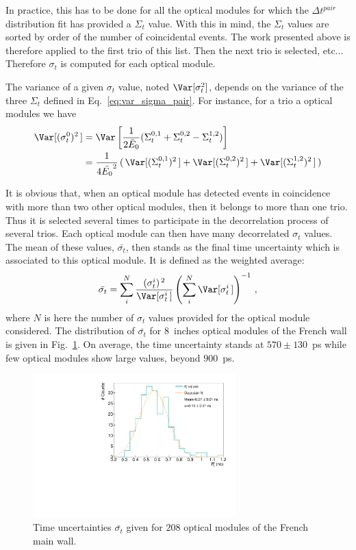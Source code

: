 In practice, this has to be done for all the optical modules for which the $\Delta {t}^{pair}$ distribution fit has provided a $\Sigma_{t}$ value.
With this in mind, the $\Sigma_{t}$ values are sorted by order of the number of coincidental events.
The work presented above is therefore applied to the first trio of this list.
Then the next trio is selected, etc...
Therefore $\sigma_{t}$ is computed for each optical module.

The variance of a given $\sigma_{t}$ value, noted $\Var[\sigma_{t}^{2}]$, depends on the variance of the three $\Sigma_{t}$ defined in Eq.~\eqref{eq:var_sigma_pair}.
For instance, for a trio a optical modules we have
\begin{align}
  \Var[(\sigma_{t}^{0})^{2}\,] &= \Var \left[ \frac{1}{2\bar{E}_{0}} (\Sigma_{t}^{0,1}+\Sigma_{t}^{0,2}-\Sigma_{t}^{1,2}) \right] \\
  &= \frac{1}{4\bar{E_{0}}^{2}}\, (\,\Var[(\Sigma_{t}^{0,1})^{2}\,]+\Var[(\Sigma_{t}^{0,2})^{2}\,]+\Var[(\Sigma_{t}^{1,2})^{2}\,]\,)
\end{align}


It is obvious that, when an optical module has detected events in coincidence with more than two other optical modules, then it belongs to more than one trio.
Thus it is selected several times to participate in the decorrelation process of several trios.
Each optical module can then have many decorrelated $\sigma_{t}$ values.
The mean of these values, $\bar{\sigma_{t}}$, then stands as the final time uncertainty which is associated to this optical module.
It is defined as the weighted average:
\begin{equation}
  \displaystyle
\bar{\sigma_{t}} = \sum_{i}^{N} \dfrac{(\sigma_{t}^{i})^{\,2}}{\Var[\sigma_{t}^{i}\,]} \left(\sum_{i}^{N} \Var[\sigma_{t}^{i}\,] \right)^{-1}\,,
\end{equation}
where $N$ is here the number of $\sigma_{t}$ values provided for the optical module considered.
The distribution of $\bar{\sigma_{t}}$ for $8$~inches optical modules of the French wall is given in Fig.~\ref{fig:final_sigmas}.
On average, the time uncertainty stands at $570\pm130$~ps while few optical modules show large values, beyond $900$~ps.
\begin{figure}[h]
  \centering
  \includegraphics[width=0.7\textwidth]{CobaltStudy/fig_CobaltStudy/final_sigmas.pdf}
  \caption{Time uncertainties $\bar{\sigma_{t}}$ given for $208$ optical modules of the French main wall.
    \label{fig:final_sigmas}}
\end{figure}

